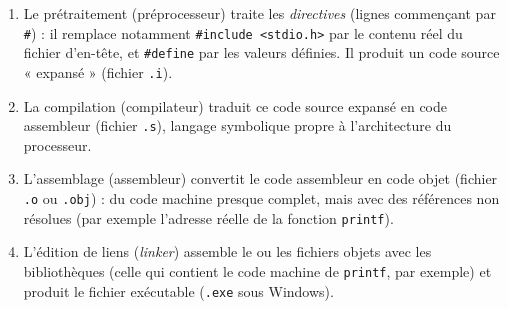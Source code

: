 \documentclass[11pt]{article}
\newcommand{\cle}[1]{{\popxbold\color{popdark}#1}}
\begin{document}
\begin{propriete}
\begin{enumerate}
\item Le \cle{prétraitement} (préprocesseur) traite les \emph{directives} (lignes commençant par \texttt{\#}) : il remplace notamment \texttt{\#include <stdio.h>} par le contenu réel du fichier d'en-tête, et \texttt{\#define} par les valeurs définies. Il produit un code source « expansé » (fichier \texttt{.i}).
\item La \cle{compilation} (compilateur) traduit ce code source expansé en \cle{code assembleur} (fichier \texttt{.s}), langage symbolique propre à l'architecture du processeur.
\item L'\cle{assemblage} (assembleur) convertit le code assembleur en \cle{code objet} (fichier \texttt{.o} ou \texttt{.obj}) : du code machine presque complet, mais avec des références non résolues (par exemple l'adresse réelle de la fonction \texttt{printf}).
\item L'\cle{édition de liens} (\emph{linker}) assemble le ou les fichiers objets avec les bibliothèques (celle qui contient le code machine de \texttt{printf}, par exemple) et produit le \cle{fichier exécutable} (\texttt{.exe} sous Windows).
\end{enumerate}
\end{propriete}
\end{document}
